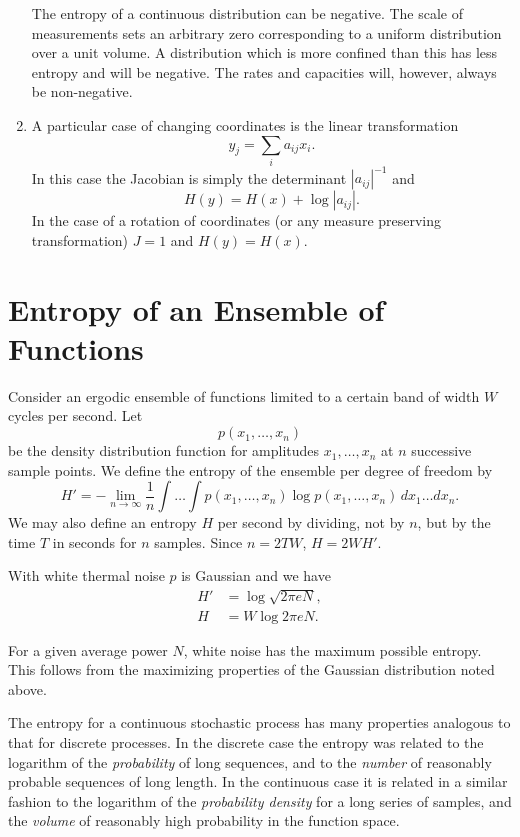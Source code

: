\begin{enumerate}
The entropy of a continuous distribution can be negative.  The scale of
measurements sets an arbitrary zero corresponding to a uniform
distribution over a unit volume.  A distribution which is more confined
than this has less entropy and will be negative.  The rates and
capacities will, however, always be non-negative.
\item
A particular case of changing coordinates is the linear transformation
$$
y_j=\sum_ia_{ij}x_i.
$$
In this case the Jacobian is simply the determinant $|a_{ij}|^{-1}$ and
$$
H(y)=H(x)+\log|a_{ij}|.
$$
In the case of a rotation of coordinates (or any measure preserving
transformation) $J=1$ and $H(y)=H(x)$.
\end{enumerate}

\section{Entropy of an Ensemble of Functions}

Consider an ergodic ensemble of functions limited to a certain band of
width $W$ cycles per second.  Let
$$
p(x_1,\dots, x_n)
$$
be the density distribution function for amplitudes $x_1,\dots,x_n$ at
$n$ successive sample points.  We define the entropy of the ensemble per
degree of freedom by
$$
H'=-\lim_{n\to\infty}\frac1n\int\dots\int p(x_1,\dots, x_n)
	\log p(x_1,\dots, x_n)\,dx_1\dots dx_n.
$$
We may also define an entropy $H$ per second by dividing, not by $n$,
but by the time $T$ in seconds for $n$ samples.  Since $n=2T W$,
$H=2W H'$.

With white thermal noise $p$ is Gaussian and we have
\begin{align*}
H'&=\log\sqrt{2\pi e N},\\
H&=W\log 2\pi e N.
\end{align*}

For a given average power $N$, white noise has the maximum possible entropy.
This follows from the maximizing properties of the Gaussian distribution
noted above.

The entropy for a continuous stochastic process has many properties
analogous to that for discrete processes.  In the discrete case the
entropy was related to the logarithm of the \emph{probability} of long
sequences, and to the \emph{number} of reasonably probable sequences of
long length.  In the continuous case it is related in a similar fashion
to the logarithm of the \emph{probability density} for a long series of
samples, and the \emph{volume} of reasonably high probability in the
function space.

